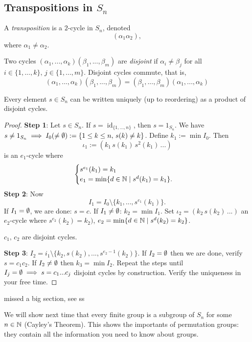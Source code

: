 \subsection{Transpositions in $S_n$}
\begin{definition}[Transpositions]
   A \emph{transposition} is a $2$-cycle in $S_n$, denoted  \[
       (\alpha_1 \alpha_2),
   \]
   where $\alpha_1 \neq \alpha_2$.
\end{definition}

\begin{definition}
    Two cycles $(\alpha_1,...,\alpha_k)(\beta_1,...,\beta_m)$ are \emph{disjoint} if $\alpha_i \neq \beta_j$ for all $i \in \{1,...,k\}, \, j \in \{1,...,m\}$. 
    Disjoint cycles commute, that is, \[
        (\alpha_1,...,\alpha_k)(\beta_1,...,\beta_m)=(\beta_1,...,\beta_m)(\alpha_1,...,\alpha_k)
    \]
\end{definition}
\begin{lemma}
    Every element $s\in S_n$ can be written uniquely (up to reordering) as a product of disjoint cycles.
\end{lemma}
\begin{proof}
    \textbf{Step 1}: Let $s\in S_n$. If $s=\operatorname{id}_{\{1,...,n\} }$, then $s=1_{S_n}$. We have $s \neq 1_{S_n} \implies I_0 (\neq \emptyset) := \{1 \leq k \leq n, \, s(k) \neq k\} $. Define $k_1 := \operatorname{min}I_0.$ Then \[
        \iota_1 := ( k_1 \,s(k_1) \, s^2(k_1)\, ... ) 
    \]
   is an $e_1$-cycle where \[
   \begin{cases}
       s^{e_1}(k_1) =k_1 \\
       e_1=\operatorname{min} \{d \in \mathbb{N}  \mid s^{d}(k_1)=k_1\}.
   \end{cases}
   \]
   \textbf{Step 2}: Now \[
       I_1=I_0\setminus \{k_1,...,s^{e_1}(k_1)\}.
   \]
   If $I_1=\emptyset$, we are done: $s = c.$ If $I_1\neq\emptyset$: $k_2=\operatorname{min}I_1$. Set $\iota_2=(k_2\,s(k_2)\,...)$ an $e_2$-cycle where $s^{e_2}(k_2)=k_2)$, $e_2=\operatorname{min}\{d\in \mathbb{N} \mid s^{d}(k_2)=k_2\} $. 
   \begin{note}
       $c_1, \, c_2$ are disjoint cycles.
   \end{note}
   \textbf{Step 3}: $I_2=i_1\setminus \{k_2,s(k_2),...,s^{e_2-1}(k_2)\} $. If $I_2=\emptyset$ then we are done, verify $s=c_1c_2$. If $I_2\neq\emptyset$ then $k_3=\operatorname{min}I_2$. Repeat the steps until $I_j = \emptyset \implies s=c_1 ... c_j$ disjoint cycles by construction. Verify the uniqueness in your free time.
\end{proof}
missed a big section, see ss
\begin{note}
    We will show next time that every finite group is a subgroup of $S_n$ for some $n\in \mathbb{N}$ (Cayley's Theorem). This shows the importants of permutation groups: they contain all the information you need to know about groups.
\end{note}




